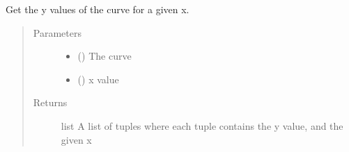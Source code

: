 \documentclass[letterpaper,10pt,english]{sphinxmanual}
\begin{document}

\begin{fulllineitems}
\label{\detokenize{pydv:pydvpy.gety}}
Get the y values of the curve for a given x.

\begin{sphinxVerbatim}[commandchars=\\\{\}]
  
\end{sphinxVerbatim}

\begin{sphinxVerbatim}[commandchars=\\\{\}]
  \PYG{p}{[}\PYG{p}{]} 
\end{sphinxVerbatim}

\begin{sphinxVerbatim}[commandchars=\\\{\}]
   \PYG{p}{[}\PYG{p}{]}
\end{sphinxVerbatim}
\begin{quote}\begin{description}
\item[{Parameters}] \leavevmode\begin{itemize}
\item {} 
 ({\hyperref[\detokenize{pydv:curve.Curve}]{}}) \textendash{} The curve

\item {} 
 () \textendash{} x value

\end{itemize}

\item[{Returns}] \leavevmode
list \textendash{} A list of tuples where each tuple contains the y value, and the given x

\end{description}\end{quote}

\end{fulllineitems}
\end{document}
